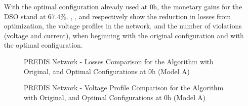 With the optimal configuration already used at $0$h, the monetary gains for the DSO stand at $67.4$\%. , , and  respectively show the reduction in losses from optimization, the voltage profiles in the network, and the number of violations (voltage and current), when beginning with the original configuration and with the optimal configuration.\\

\begin{figure}[!h]
\begin{minipage}[!h]{.5\textwidth}
	\centering
    \setlength\figureheight{5cm}
    \setlength\figurewidth{6cm}
	
\end{minipage}
\begin{minipage}[!h]{.5\textwidth}
	\centering
	\setlength\figureheight{5cm}
    \setlength\figurewidth{6cm}
	
\end{minipage}
\caption{PREDIS Network - Losses Comparison for the Algorithm with Original, and Optimal Configurations at $0$h (Model A)}
\end{figure}

\begin{figure}[!h]
\begin{minipage}[!h]{.5\textwidth}
	\centering
    \setlength\figureheight{5cm}
    \setlength\figurewidth{6cm}
	
\end{minipage}
\begin{minipage}[!h]{.5\textwidth}
	\centering
	\setlength\figureheight{5cm}
    \setlength\figurewidth{6cm}
	
\end{minipage}
\caption{PREDIS Network - Voltage Profile Comparison for the Algorithm with Original, and Optimal Configurations at $0$h (Model A)}
\end{figure}

